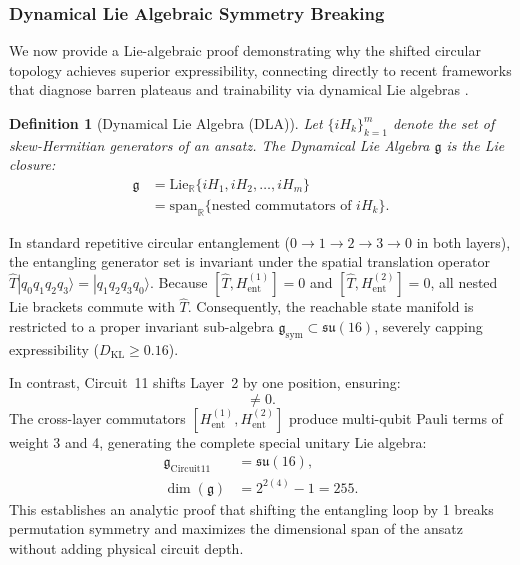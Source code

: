 \documentclass[pdflatex,sn-mathphys-num]{sn-jnl}%
\theoremstyle{thmstyleone}%
\theoremstyle{thmstyletwo}%
\theoremstyle{thmstylethree}%
\newtheorem{definition}{Definition}%
\begin{document}
\subsubsection{Dynamical Lie Algebraic Symmetry Breaking}
We now provide a Lie-algebraic proof demonstrating why the shifted circular topology achieves superior expressibility, connecting directly to recent frameworks that diagnose barren plateaus and trainability via dynamical Lie algebras \cite{larocca2022diagnosing}.

\begin{definition}[Dynamical Lie Algebra (DLA)]
Let $\{i H_k\}_{k=1}^m$ denote the set of skew-Hermitian generators of an ansatz. The Dynamical Lie Algebra $\mathfrak{g}$ is the Lie closure:
\begin{align}
\mathfrak{g} &= \mathrm{Lie}_{\mathbb{R}}\{i H_1, i H_2, \dots, i H_m\} \nonumber \\
&= \mathrm{span}_{\mathbb{R}}\{ \text{nested commutators of } i H_k \}.
\label{eq:dla_definition}
\end{align}
\end{definition}

In standard repetitive circular entanglement ($0 \to 1 \to 2 \to 3 \to 0$ in both layers), the entangling generator set is invariant under the spatial translation operator $\hat{T}|q_0 q_1 q_2 q_3\rangle = |q_1 q_2 q_3 q_0\rangle$. Because $[\hat{T}, H_{\mathrm{ent}}^{(1)}] = 0$ and $[\hat{T}, H_{\mathrm{ent}}^{(2)}] = 0$, all nested Lie brackets commute with $\hat{T}$. Consequently, the reachable state manifold is restricted to a proper invariant sub-algebra $\mathfrak{g}_{\mathrm{sym}} \subset \mathfrak{su}(16)$, severely capping expressibility ($D_{\mathrm{KL}} \ge 0.16$).

In contrast, Circuit~11 shifts Layer~2 by one position, ensuring:
\begin{equation}
[\hat{T}, H_{\mathrm{ent}}^{(2)}] \neq 0.
\label{eq:translation_breaking}
\end{equation}
The cross-layer commutators $[H_{\mathrm{ent}}^{(1)}, H_{\mathrm{ent}}^{(2)}]$ produce multi-qubit Pauli terms of weight 3 and 4, generating the complete special unitary Lie algebra:
\begin{align}
\mathfrak{g}_{\mathrm{Circuit11}} &= \mathfrak{su}(16), \nonumber \\
\dim(\mathfrak{g}) &= 2^{2(4)} - 1 = 255.
\label{eq:full_algebra}
\end{align}
This establishes an analytic proof that shifting the entangling loop by 1 breaks permutation symmetry and maximizes the dimensional span of the ansatz without adding physical circuit depth.
\end{document}
